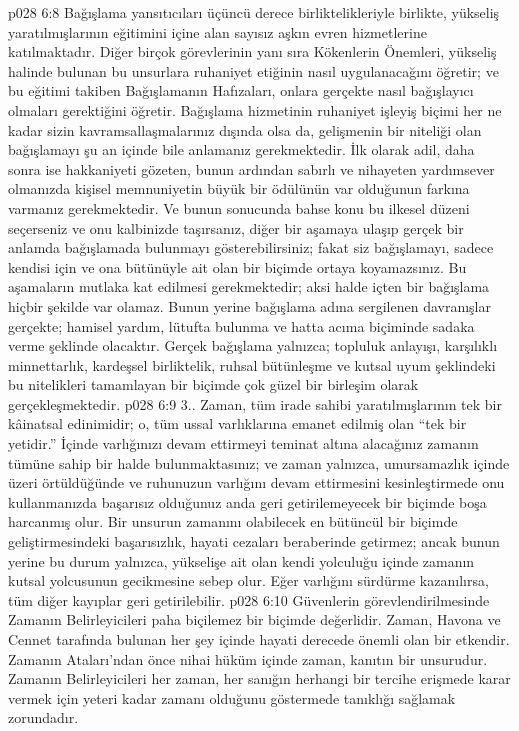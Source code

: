 \vs p028 6:8 Bağışlama yansıtıcıları üçüncü derece birliktelikleriyle birlikte, yükseliş yaratılmışlarının eğitimini içine alan sayısız aşkın evren hizmetlerine katılmaktadır. Diğer birçok görevlerinin yanı sıra Kökenlerin Önemleri, yükseliş halinde bulunan bu unsurlara ruhaniyet etiğinin nasıl uygulanacağını öğretir; ve bu eğitimi takiben Bağışlamanın Hafızaları, onlara gerçekte nasıl bağışlayıcı olmaları gerektiğini öğretir. Bağışlama hizmetinin ruhaniyet işleyiş biçimi her ne kadar sizin kavramsallaşmalarınız dışında olsa da, gelişmenin bir niteliği olan bağışlamayı şu an içinde bile anlamanız gerekmektedir. İlk olarak adil, daha sonra ise hakkaniyeti gözeten, bunun ardından sabırlı ve nihayeten yardımsever olmanızda kişisel memnuniyetin büyük bir ödülünün var olduğunun farkına varmanız gerekmektedir. Ve bunun sonucunda bahse konu bu ilkesel düzeni seçerseniz ve onu kalbinizde taşırsanız, diğer bir aşamaya ulaşıp gerçek bir anlamda bağışlamada bulunmayı gösterebilirsiniz; fakat siz bağışlamayı, sadece kendisi için ve ona bütünüyle ait olan bir biçimde ortaya koyamazsınız. Bu aşamaların mutlaka kat edilmesi gerekmektedir; aksi halde içten bir bağışlama hiçbir şekilde var olamaz. Bunun yerine bağışlama adına sergilenen davranışlar gerçekte; hamisel yardım, lütufta bulunma ve hatta acıma biçiminde sadaka verme şeklinde olacaktır. Gerçek bağışlama yalnızca; topluluk anlayışı, karşılıklı minnettarlık, kardeşsel birliktelik, ruhsal bütünleşme ve kutsal uyum şeklindeki bu nitelikleri tamamlayan bir biçimde çok güzel bir birleşim olarak gerçekleşmektedir.
\vs p028 6:9 3.\bibnobreakspace {}. Zaman, tüm irade sahibi yaratılmışlarının tek bir kâinatsal edinimidir; o, tüm ussal varlıklarına emanet edilmiş olan “tek bir yetidir.” İçinde varlığınızı devam ettirmeyi teminat altına alacağınız zamanın tümüne sahip bir halde bulunmaktasınız; ve zaman yalnızca, umursamazlık içinde üzeri örtüldüğünde ve ruhunuzun varlığını devam ettirmesini kesinleştirmede onu kullanmanızda başarısız olduğunuz anda geri getirilemeyecek bir biçimde boşa harcanmış olur. Bir unsurun zamanını olabilecek en bütüncül bir biçimde geliştirmesindeki başarısızlık, hayati cezaları beraberinde getirmez; ancak bunun yerine bu durum yalnızca, yükselişe ait olan kendi yolculuğu içinde zamanın kutsal yolcusunun gecikmesine sebep olur. Eğer varlığını sürdürme kazanılırsa, tüm diğer kayıplar geri getirilebilir.
\vs p028 6:10 Güvenlerin görevlendirilmesinde Zamanın Belirleyicileri paha biçilemez bir biçimde değerlidir. Zaman, Havona ve Cennet tarafında bulunan her şey içinde hayati derecede önemli olan bir etkendir. Zamanın Ataları’ndan önce nihai hüküm içinde zaman, kanıtın bir unsurudur. Zamanın Belirleyicileri her zaman, her sanığın herhangi bir tercihe erişmede karar vermek için yeteri kadar zamanı olduğunu göstermede tanıklığı sağlamak zorundadır.
